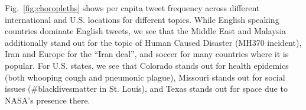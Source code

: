 Fig.~\ref{fig:choropleths} shows per capita tweet frequency across
different international and U.S. locations for different topics.
While English speaking countries dominate English tweets, we
see that the Middle East and Malaysia additionally stand out for the
topic of Human Caused Disaster (MH370 incident), Iran and Europe
for the ``Iran deal'', and
soccer for many countries where it is popular.  For U.S. states,
we see that Colorado stands out for health epidemics (both whooping
cough and pneumonic plague), Missouri stands out for social issues
(\#blacklivesmatter in St. Louis), and Texas stands out for space due to
NASA's presence there.

\begin{table}[t!]
\centering
{\renewcommand{\arraystretch}{1.2}
}
%
{\renewcommand{\arraystretch}{1.2}
}
\end{table}
